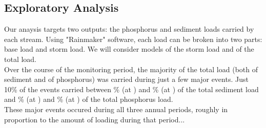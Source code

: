 \subsection{Exploratory Analysis}
Our anaysis targets two outputs: the phosphorus and sediment loads carried by each stream. Using "Rainmaker" software, each load can be broken into two parts: base load and storm load. We will consider models of the storm load and of the total load.\\


Over the course of the monitoring period, the majority of the total load (both of sediment and of phosphorus) was carried during just a few major events. Just 10\% of the events carried between \% (at ) and \% (at ) of the total sediment load and \% (at ) and \% (at ) of the total phosphorus load.\\


These major events occured during all three annual periods, roughly in proportion to the amount of loading during that period...
